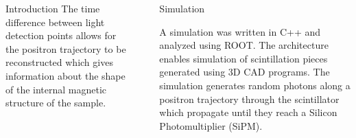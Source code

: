 \documentclass[final]{beamer}
\newlength{\sepwid}
\newlength{\onecolwid}
\newlength{\twocolwid}
\begin{document}
\begin{frame}[t]
\begin{columns}[t]
\begin{column}{\onecolwid}
\begin{block}{Introduction}
 The time difference between light detection points allows for the positron trajectory to be reconstructed which gives information about the shape of the internal magnetic structure of the sample.

\end{block}





\end{column} %

\begin{column}{\sepwid}\end{column} %

\begin{column}{\twocolwid} %

\begin{columns}[t,totalwidth=\twocolwid] %

\begin{column}{\onecolwid}\vspace{-.6in} %



\begin{block}{Simulation}

A simulation was written in C++ and analyzed using ROOT. The architecture enables simulation of scintillation pieces generated using 3D CAD programs. The simulation generates random photons along a positron trajectory through the scintillator which propagate until they reach a Silicon Photomultiplier (SiPM).



\end{block}
\end{column}
\end{columns}
\end{column}
\end{columns}
\end{frame}
\end{document}
